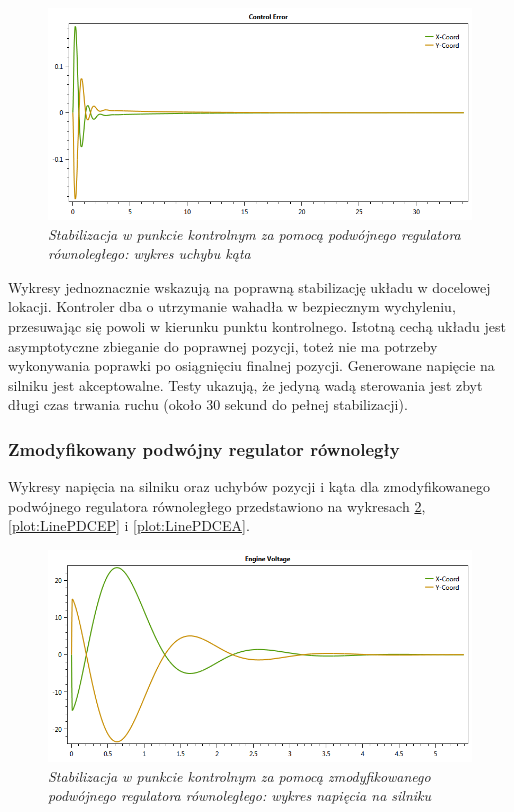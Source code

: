 \documentclass[12pt, oneside]{report}
\theoremstyle{definition}
\begin{document}
\begin{figure}[H]
	\centering
		\includegraphics[width = 350pt]{LinePIDCEA} 
		\caption{\textit{Stabilizacja w punkcie kontrolnym za pomocą podwójnego regulatora równoległego: wykres uchybu kąta}}
		\label{plot:LinePIDCEA}
\end{figure}

Wykresy jednoznacznie wskazują na poprawną stabilizację układu w docelowej lokacji. Kontroler dba o utrzymanie wahadła w bezpiecznym wychyleniu, przesuwając się powoli w kierunku punktu kontrolnego. Istotną cechą układu jest asymptotyczne zbieganie do poprawnej pozycji, toteż nie ma potrzeby wykonywania poprawki po osiągnięciu finalnej pozycji. Generowane napięcie na silniku jest akceptowalne. Testy ukazują, że jedyną wadą sterowania jest zbyt długi czas trwania ruchu (około 30 sekund do pełnej stabilizacji).

\subsubsection{Zmodyfikowany podwójny regulator równoległy}
Wykresy napięcia na silniku oraz uchybów pozycji i kąta dla zmodyfikowanego podwójnego regulatora równoległego przedstawiono na wykresach \ref{plot:LinePDEV}, \ref{plot:LinePDCEP} i \ref{plot:LinePDCEA}.

\begin{figure}[H]
	\centering
		\includegraphics[width = 350pt]{LinePDEV} 
		\caption{\textit{Stabilizacja w punkcie kontrolnym za pomocą zmodyfikowanego podwójnego regulatora równoległego: wykres napięcia na silniku}}
		\label{plot:LinePDEV}
\end{figure}
\end{document}
